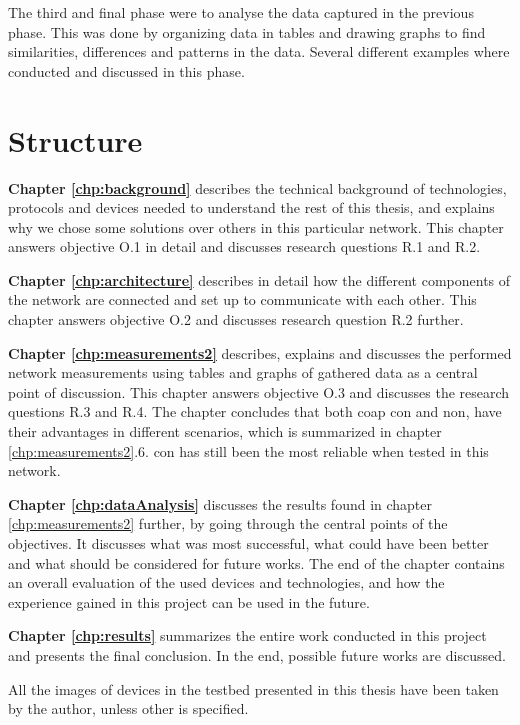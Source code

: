 \noindent The third and final phase were to analyse the data captured in the previous phase. This was done by organizing data in tables and drawing graphs to find similarities, differences and patterns in the data. Several different examples where conducted and discussed in this phase. 


\section{Structure}


\noindent \textbf{Chapter \ref{chp:background}} describes the technical background of technologies, protocols and devices needed to understand the rest of this thesis, and explains why we chose some solutions over others in this particular network. This chapter answers objective O.1 in detail and discusses research questions R.1 and R.2. 

\noindent \textbf{Chapter \ref{chp:architecture}} describes in detail how the different components of the network are connected and set up to communicate with each other. This chapter answers objective O.2 and discusses research question R.2 further. 

\noindent \textbf{Chapter \ref{chp:measurements2}} describes, explains and discusses the performed network measurements using tables and graphs of gathered data as a central point of discussion. This chapter answers objective O.3 and discusses the research questions R.3 and R.4. The chapter concludes that both \gls{coap} \gls{con} and \gls{non}, have their advantages in different scenarios, which is summarized in chapter \ref{chp:measurements2}.6. \gls{con} has still been the most reliable when tested in this network. 

\noindent \textbf{Chapter \ref{chp:dataAnalysis}} discusses the results found in chapter \ref{chp:measurements2} further, by going through the central points of the objectives. It discusses what was most successful, what could have been better and what should be considered for future works. The end of the chapter contains an overall evaluation of the used devices and technologies, and how the experience gained in this project can be used in the future. 

\noindent \textbf{Chapter \ref{chp:results}} summarizes the entire work conducted in this project and presents the final conclusion. In the end, possible future works are discussed. 

\noindent All the images of devices in the testbed presented in this thesis have been taken by the author, unless other is specified.





